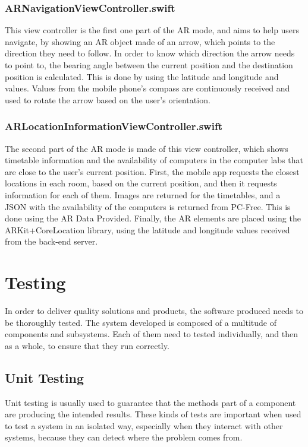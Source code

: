 \subsubsection*{ARNavigationViewController.swift}
This view controller is the first one part of the AR mode, and aims to help users navigate, by showing an AR object made of an arrow, which points to the direction they need to follow. In order to know which direction the arrow needs to point to, the bearing angle between the current position and the destination position is calculated. This is done by using the latitude and longitude and values. Values from the mobile phone's compass are continuously received and used to rotate the arrow based on the user's orientation.

\subsubsection*{ARLocationInformationViewController.swift}
The second part of the AR mode is made of this view controller, which shows timetable information and the availability of computers in the computer labs that are close to the user's current position. First, the mobile app requests the closest locations in each room, based on the current position, and then it requests information for each of them. Images are returned for the timetables, and a JSON with the availability of the computers is returned from PC-Free. This is done using the AR Data Provided. Finally, the AR elements are placed using the ARKit+CoreLocation library, using the latitude and longitude values received from the back-end server.

\section{Testing}
In order to deliver quality solutions and products, the software produced needs to be thoroughly tested. The system developed is composed of a multitude of components and subsystems. Each of them need to tested individually, and then as a whole, to ensure that they run correctly.

\subsection{Unit Testing}
Unit testing is usually used to guarantee that the methods part of a component are producing the intended results. These kinds of tests are important when used to test a system in an isolated way, especially when they interact with other systems, because they can detect where the problem comes from. 

